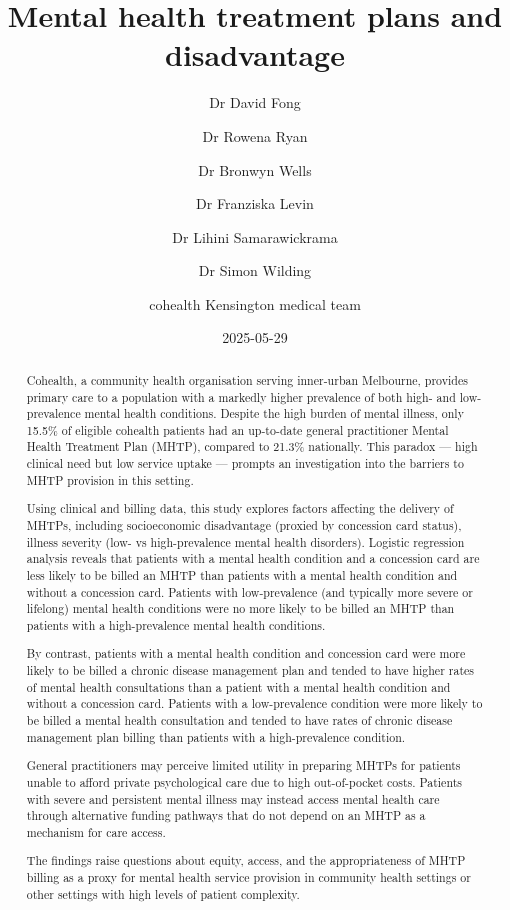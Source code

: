 \documentclass[
  letterpaper,
  DIV=11,
  numbers=noendperiod,
  oneside]{scrartcl}
\title{Mental health treatment plans and disadvantage}
\author{Dr David Fong \and Dr Rowena Ryan \and Dr Bronwyn Wells \and Dr
Franziska Levin \and Dr Lihini Samarawickrama \and Dr Simon
Wilding \and cohealth Kensington medical team}
\date{2025-05-29}
\begin{document}
\maketitle
\begin{abstract}
Cohealth, a community health organisation serving inner-urban Melbourne,
provides primary care to a population with a markedly higher prevalence
of both high- and low- prevalence mental health conditions. Despite the
high burden of mental illness, only 15.5\% of eligible cohealth patients
had an up-to-date general practitioner Mental Health Treatment Plan
(MHTP), compared to 21.3\% nationally. This paradox --- high clinical
need but low service uptake --- prompts an investigation into the
barriers to MHTP provision in this setting.

Using clinical and billing data, this study explores factors affecting
the delivery of MHTPs, including socioeconomic disadvantage (proxied by
concession card status), illness severity (low- vs high-prevalence
mental health disorders). Logistic regression analysis reveals that
patients with a mental health condition and a concession card are less
likely to be billed an MHTP than patients with a mental health condition
and without a concession card. Patients with low-prevalence (and
typically more severe or lifelong) mental health conditions were no more
likely to be billed an MHTP than patients with a high-prevalence mental
health conditions.

By contrast, patients with a mental health condition and concession card
were more likely to be billed a chronic disease management plan and
tended to have higher rates of mental health consultations than a
patient with a mental health condition and without a concession card.
Patients with a low-prevalence condition were more likely to be billed a
mental health consultation and tended to have rates of chronic disease
management plan billing than patients with a high-prevalence condition.

General practitioners may perceive limited utility in preparing MHTPs
for patients unable to afford private psychological care due to high
out-of-pocket costs. Patients with severe and persistent mental illness
may instead access mental health care through alternative funding
pathways that do not depend on an MHTP as a mechanism for care access.

The findings raise questions about equity, access, and the
appropriateness of MHTP billing as a proxy for mental health service
provision in community health settings or other settings with high
levels of patient complexity.
\end{abstract}
\end{document}
